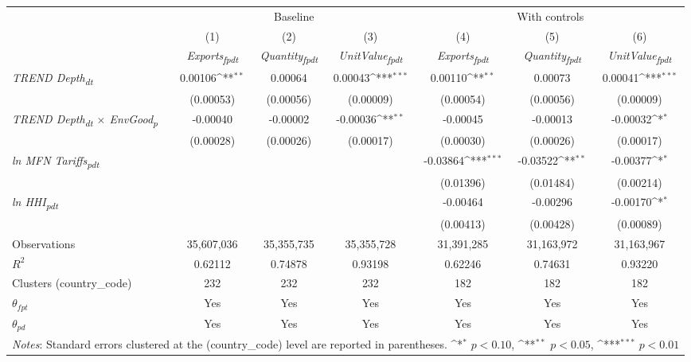 {
\def\sym#1{\ifmmode^{#1}\else\(^{#1}\)\fi}
\begin{tabular}{l*{6}{c}}
\toprule
&\multicolumn{3}{c}{Baseline}&\multicolumn{3}{c}{With controls}\\\cmidrule(lr){2-4}\cmidrule(lr){5-7}
&(1)&(2)&(3)&(4)&(5)&(6)\\
&\textit{Exports\textsubscript{fpdt}}&\textit{Quantity\textsubscript{fpdt}}&\textit{UnitValue\textsubscript{fpdt}}&\textit{Exports\textsubscript{fpdt}}&\textit{Quantity\textsubscript{fpdt}}&\textit{UnitValue\textsubscript{fpdt}}\\
\midrule
\textit{TREND Depth\textsubscript{dt}} & 0.00106\sym{**} & 0.00064 & 0.00043\sym{***} & 0.00110\sym{**} & 0.00073 & 0.00041\sym{***}\\
 & (0.00053) & (0.00056) & (0.00009) & (0.00054) & (0.00056) & (0.00009)\\
\addlinespace
\textit{TREND Depth\textsubscript{dt} $\times$ EnvGood\textsubscript{p}} & -0.00040 & -0.00002 & -0.00036\sym{**} & -0.00045 & -0.00013 & -0.00032\sym{*}\\
 & (0.00028) & (0.00026) & (0.00017) & (0.00030) & (0.00026) & (0.00017)\\
\addlinespace
\textit{ln MFN Tariffs\textsubscript{pdt}} &  &  &  & -0.03864\sym{***} & -0.03522\sym{**} & -0.00377\sym{*}\\
 &  &  &  & (0.01396) & (0.01484) & (0.00214)\\
\addlinespace
\textit{ln HHI\textsubscript{pdt}} &  &  &  & -0.00464 & -0.00296 & -0.00170\sym{*}\\
 &  &  &  & (0.00413) & (0.00428) & (0.00089)\\
\midrule
Observations & 35,607,036 & 35,355,735 & 35,355,728 & 31,391,285 & 31,163,972 & 31,163,967\\
$R^{2}$ & 0.62112 & 0.74878 & 0.93198 & 0.62246 & 0.74631 & 0.93220\\
Clusters (country_code) & 232 & 232 & 232 & 182 & 182 & 182\\
$\theta_{fpt}$ & Yes & Yes & Yes & Yes & Yes & Yes\\
$\theta_{pd}$ & Yes & Yes & Yes & Yes & Yes & Yes\\
\bottomrule
\multicolumn{7}{l}{\footnotesize \textit{Notes}: Standard errors clustered at the (country_code) level are reported in parentheses. \sym{*} \(p<0.10\), \sym{**} \(p<0.05\), \sym{***} \(p<0.01\)}\\
\end{tabular}
}
